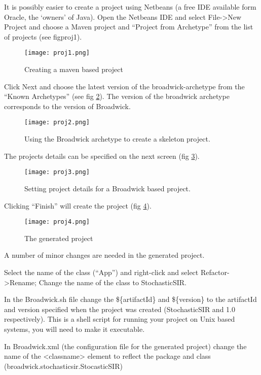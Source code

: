 It is possibly easier to create a project using Netbeans (a free IDE available form Oracle, the ‘owners’ of Java). Open the Netbeans IDE and select File->New Project and choose a Maven project and “Project from Archetype” from the list of projects (see fig{proj1}).

\begin{figure}[h]
\centering\texttt{[image: proj1.png]}
\caption{Creating a maven based project}
\label{proj1}
\end{figure}

Click Next and choose the latest version of the broadwick-archetype from the ``Known Archetypes” (see fig \ref{proj2}). The version of the broadwick archetype corresponds to the version of Broadwick.

\begin{figure}[h!]
\centering\texttt{[image: proj2.png]}
\caption{Using the Broadwick archetype to create a skeleton project.}
\label{proj2}
\end{figure}

The projects details can be specified on the next screen (fig \ref{proj3}).

\begin{figure}[h!]
\centering\texttt{[image: proj3.png]}
\caption{Setting project details for a Broadwick based project.}
\label{proj3}
\end{figure}

Clicking ``Finish” will create the project (fig \ref{proj4}).

\begin{figure}[h!]
\centering\texttt{[image: proj4.png]}
\caption{The generated project}
\label{proj4}
\end{figure}

A number of minor changes are needed in the generated project.

Select the name of the class (``App”) and right-click and select Refactor->Rename; Change the name of the class to StochasticSIR.

In the Broadwick.sh file change the \$\{artifactId\} and \$\{version\} to the artifactId and version specified when the project was created (StochasticSIR and 1.0 respectively). This is a shell script for running your project on Unix based systems, you will need to make it executable.

In Broadwick.xml (the configuration file for the generated project) change the name of the <classname> element to reflect the package and class (broadwick.stochasticsir.StocasticSIR)

